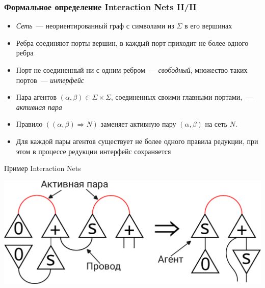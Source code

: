 \documentclass
  [ russian
  , aspectratio=169 %
  ] {beamer}
\begin{document}
\begin{frame}
    \frametitle{Формальное определение Interaction Nets II/II}

    \begin{itemize}
        \item \textit{Сеть}~--- неориентированный граф с символами из $\Sigma$ в его вершинах
        \item Ребра соединяют порты вершин, в каждый порт приходит не более одного ребра
        \item Порт не соединенный ни с одним ребром~--- \textit{свободный}, множество таких портов~--- \textit{интерфейс}
        \item Пара агентов $(\alpha, \beta) \in \Sigma \times \Sigma$, соединенных своими главными портами,~--- \textit{активная пара}
        \item Правило $((\alpha, \beta) \Longrightarrow N)$ заменяет активную пару $(\alpha, \beta)$ на сеть $N$.
        \item Для каждой пары агентов существует не более одного правила редукции, при этом в процессе редукции интерфейс сохраняется
    \end{itemize}

\end{frame}

\begin{frame}{Пример Interaction Nets}

    \begin{center}
        \includegraphics[width=\textwidth]{figures/in_talk.pdf}
    \end{center}

\end{frame}
\end{document}
